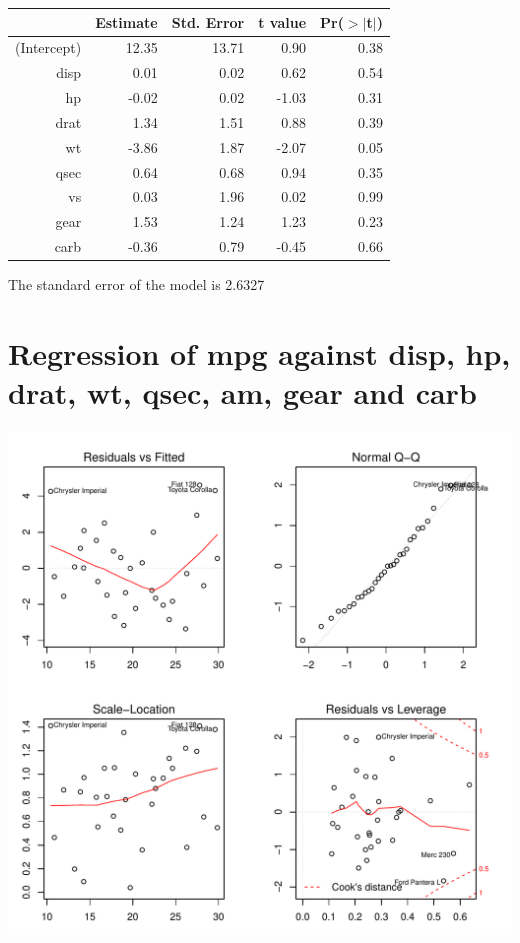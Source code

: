 \documentclass{article}\usepackage[]{graphicx}\usepackage[]{color}
\makeatletter
\def\maxwidth{ %
  \ifdim\Gin@nat@width>\linewidth
    \linewidth
  \else
    \Gin@nat@width
  \fi
}
\newenvironment{knitrout}{}{} %
\makeatother
\begin{document}
\begin{table}[ht]
\centering
\begin{tabular}{rrrrr}
  \hline
 & Estimate & Std. Error & t value & Pr($>$$|$t$|$) \\ 
  \hline
(Intercept) & 12.35 & 13.71 & 0.90 & 0.38 \\ 
  disp & 0.01 & 0.02 & 0.62 & 0.54 \\ 
  hp & -0.02 & 0.02 & -1.03 & 0.31 \\ 
  drat & 1.34 & 1.51 & 0.88 & 0.39 \\ 
  wt & -3.86 & 1.87 & -2.07 & 0.05 \\ 
  qsec & 0.64 & 0.68 & 0.94 & 0.35 \\ 
  vs & 0.03 & 1.96 & 0.02 & 0.99 \\ 
  gear & 1.53 & 1.24 & 1.23 & 0.23 \\ 
  carb & -0.36 & 0.79 & -0.45 & 0.66 \\ 
   \hline
\end{tabular}
\end{table}




The standard error of the model is 2.6327

\newpage

\section{Regression of mpg against disp, hp, drat, wt, qsec, am, gear and carb }
\begin{knitrout}
\color{fgcolor}

{\centering \includegraphics[width=\maxwidth]{figure/lm-disp-hp-drat-wt-qsec-am-gear-carb} 

}



\end{knitrout}
\end{document}
